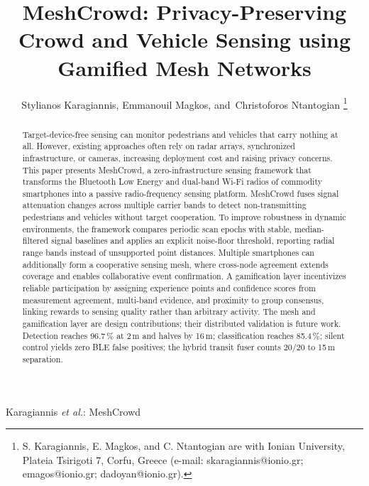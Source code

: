 \documentclass[journal,10pt]{IEEEtran}
\begin{document}
\title{MeshCrowd: Privacy-Preserving Crowd and Vehicle Sensing using Gamified Mesh Networks}

\author{Stylianos Karagiannis,
        Emmanouil Magkos,
        and~Christoforos Ntantogian%
\thanks{S. Karagiannis, E. Magkos, and C. Ntantogian are with Ionian
University, Plateia Tsirigoti 7, Corfu, Greece (e-mail:
skaragiannis@ionio.gr; emagos@ionio.gr; dadoyan@ionio.gr).}}

%
{Karagiannis \MakeLowercase{\textit{et al.}}: MeshCrowd}

\maketitle

\begin{abstract}
Target-device-free sensing can monitor pedestrians and vehicles that
carry nothing at all. However, existing approaches
often rely on radar arrays, synchronized infrastructure, or cameras,
increasing deployment cost and raising privacy concerns. This paper presents
MeshCrowd, a zero-infrastructure sensing framework that transforms the
Bluetooth Low Energy and dual-band Wi-Fi radios of commodity smartphones into
a passive radio-frequency sensing platform. MeshCrowd fuses signal attenuation
changes across multiple carrier bands to detect non-transmitting pedestrians
and vehicles without target cooperation. To improve robustness in dynamic
environments, the framework compares periodic scan epochs with stable,
median-filtered signal baselines and applies an explicit noise-floor
threshold, reporting radial range bands instead of unsupported point
distances. Multiple smartphones can additionally form a cooperative sensing
mesh, where cross-node agreement extends coverage and enables collaborative
event confirmation. A gamification layer incentivizes reliable participation
by assigning experience points and confidence scores from measurement
agreement, multi-band evidence, and proximity to group consensus, linking rewards to sensing quality rather than arbitrary activity. The mesh and gamification layer are design contributions; their distributed validation is future work. Detection reaches 96.7\,\% at 2\,m
and halves by 16\,m; classification reaches 85.4\,\%; silent control yields zero BLE
false positives; the hybrid transit fuser counts 20/20 to 15\,m separation. 
\end{abstract}
\end{document}
